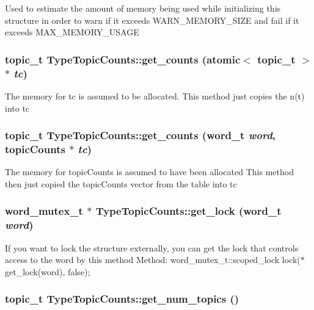 \label{class_type_topic_counts_ab69a6701ed9e110f9c5ac25e933899ec}
Used to estimate the amount of memory being used while initializing this structure in order to warn if it exceeds WARN\_\-MEMORY\_\-SIZE and fail if it exceeds MAX\_\-MEMORY\_\-USAGE \hypertarget{class_type_topic_counts_a8fe14c5595b71fd856197e198ea67196}{
\subsubsection[{get\_\-counts}]{\setlength{\rightskip}{0pt plus 5cm}topic\_\-t TypeTopicCounts::get\_\-counts (atomic$<$ topic\_\-t $>$ $\ast$ {\em tc})}}
\label{class_type_topic_counts_a8fe14c5595b71fd856197e198ea67196}
The memory for tc is assumed to be allocated. This method just copies the n(t) into tc \hypertarget{class_type_topic_counts_af6811be58a729eed6909236f0c22c554}{
\subsubsection[{get\_\-counts}]{\setlength{\rightskip}{0pt plus 5cm}topic\_\-t TypeTopicCounts::get\_\-counts (word\_\-t {\em word}, \/  {\bf topicCounts} $\ast$ {\em tc})}}
\label{class_type_topic_counts_af6811be58a729eed6909236f0c22c554}
The memory for topicCounts is assumed to have been allocated This method then just copied the topicCounts vector from the table into tc \hypertarget{class_type_topic_counts_a109fdf5a24f0dc898d828e5ebe55e34f}{
\subsubsection[{get\_\-lock}]{\setlength{\rightskip}{0pt plus 5cm}word\_\-mutex\_\-t $\ast$ TypeTopicCounts::get\_\-lock (word\_\-t {\em word})}}
\label{class_type_topic_counts_a109fdf5a24f0dc898d828e5ebe55e34f}
If you want to lock the structure externally, you can get the lock that controls access to the word by this method Method: word\_\-mutex\_\-t::scoped\_\-lock lock($\ast$get\_\-lock(word), false); \hypertarget{class_type_topic_counts_a443c1fcce5b88993cea9891137f9f5fa}{
\subsubsection[{get\_\-num\_\-topics}]{\setlength{\rightskip}{0pt plus 5cm}topic\_\-t TypeTopicCounts::get\_\-num\_\-topics ()}}
